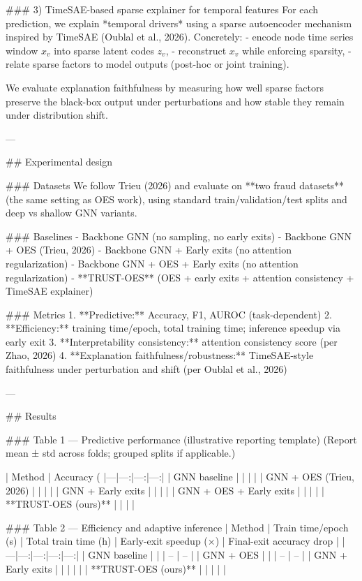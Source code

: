 ### 3) TimeSAE-based sparse explainer for temporal features  
For each prediction, we explain *temporal drivers* using a sparse autoencoder mechanism inspired by TimeSAE (Oublal et al., 2026). Concretely:
- encode node time series window \(x_v\) into sparse latent codes \(z_v\),
- reconstruct \(x_v\) while enforcing sparsity,
- relate sparse factors to model outputs (post-hoc or joint training).

We evaluate explanation faithfulness by measuring how well sparse factors preserve the black-box output under perturbations and how stable they remain under distribution shift.

---

## Experimental design  

### Datasets  
We follow Trieu (2026) and evaluate on **two fraud datasets** (the same setting as OES work), using standard train/validation/test splits and deep vs shallow GNN variants.

### Baselines  
- Backbone GNN (no sampling, no early exits)  
- Backbone GNN + OES (Trieu, 2026)  
- Backbone GNN + Early exits (no attention regularization)  
- Backbone GNN + OES + Early exits (no attention regularization)  
- **TRUST-OES** (OES + early exits + attention consistency + TimeSAE explainer)

### Metrics  
1. **Predictive:** Accuracy, F1, AUROC (task-dependent)  
2. **Efficiency:** training time/epoch, total training time; inference speedup via early exit  
3. **Interpretability consistency:** attention consistency score (per Zhao, 2026)  
4. **Explanation faithfulness/robustness:** TimeSAE-style faithfulness under perturbation and shift (per Oublal et al., 2026)

---

## Results  

### Table 1 — Predictive performance (illustrative reporting template)  
(Report mean ± std across folds; grouped splits if applicable.)

| Method | Accuracy (%
|---|---:|---:|---:|
| GNN baseline |  |  |  |
| GNN + OES (Trieu, 2026) |  |  |  |
| GNN + Early exits |  |  |  |
| GNN + OES + Early exits |  |  |  |
| **TRUST-OES (ours)** |  |  |  |

### Table 2 — Efficiency and adaptive inference  
| Method | Train time/epoch (s) | Total train time (h) | Early-exit speedup (×) | Final-exit accuracy drop |
|---|---:|---:|---:|---:|
| GNN baseline |  |  | – | – |
| GNN + OES |  |  | – | – |
| GNN + Early exits |  |  |  |  |
| **TRUST-OES (ours)** |  |  |  |  |

